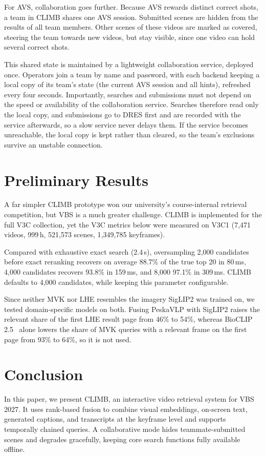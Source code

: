\documentclass{llncs}
\begin{document}
For AVS, collaboration goes further. Because AVS rewards distinct correct shots, a team in CLIMB shares one AVS session.
Submitted scenes are hidden from the results of all team members. Other scenes of these videos are marked as covered,
steering the team towards new videos, but stay visible, since one video can hold several correct shots.

This shared state is maintained by a lightweight collaboration service, deployed once. Operators join a team by name and password,
with each backend keeping a local copy of its team's state (the current AVS session and all hints), refreshed every four seconds.
Importantly, searches and submissions must not depend on the speed or availability of the collaboration service.
Searches therefore read only the local copy, and submissions go to DRES first and are recorded with the service afterwards, so a slow service never delays them.
If the service becomes unreachable, the local copy is kept rather than cleared, so the team's exclusions survive an unstable connection.



\section{Preliminary Results} \label{results}
A far simpler CLIMB prototype won our university's course-internal retrieval competition, but VBS is a much greater challenge.
CLIMB is implemented for the full V3C collection, yet the V3C metrics below were measured on V3C1 (7{,}471 videos, 999\,h, 521{,}573 scenes, 1{,}349{,}785 keyframes).

Compared with exhaustive exact search (2.4\,s), oversampling 2{,}000 candidates before exact reranking recovers on average 88.7\% of the
true top 20 in 80\,ms, 4{,}000 candidates recovers 93.8\% in 159\,ms, and 8{,}000 97.1\% in 309\,ms. CLIMB defaults to 4{,}000 candidates,
while keeping this parameter configurable.

Since neither MVK nor LHE resembles the imagery SigLIP2 was trained on, we tested domain-specific models on both.
Fusing PeskaVLP with SigLIP2 raises the relevant share of the first LHE result page from 46\% to 54\%, whereas
BioCLIP 2.5~\cite{bioclip} alone lowers the share of MVK queries with a relevant frame on the first page from 93\% to 64\%, so it is not used.

\section{Conclusion}
In this paper, we present CLIMB, an interactive video retrieval system for VBS 2027. It uses rank-based fusion to combine visual embeddings, 
on-screen text, generated captions, and transcripts at the keyframe level and supports temporally chained queries. 
A collaborative mode hides teammate-submitted scenes and degrades gracefully, keeping core search functions fully available offline.


\newpage


\end{document}
